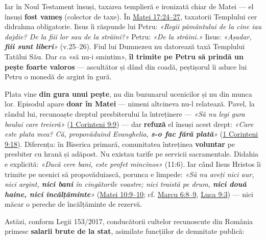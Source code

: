 \documentclass[12pt,a4paper,twoside,openany]{book}
\begin{document}
Iar în Noul Testament însuși, taxarea templieră e ironizată chiar de Matei — el însuși \textbf{fost vameș} (colector de taxe). În \href{https://bibliaortodoxa.ro/carte.php?id=55\&cap=17\#24}{Matei 17:24–27}, taxatorii Templului cer didrahma obligatorie. Iisus îi răspunde lui Petru: \textit{«Regii pământului de la cine iau dajdie? De la fiii lor sau de la străini?»} Petru: \textit{«De la străini.»} Iisus: \textit{«Așadar, \textbf{fiii sunt liberi}»} (v.25–26). Fiul lui Dumnezeu nu datorează taxă Templului Tatălui Său. Dar ca «să nu-i smintim», \textbf{îl trimite pe Petru să prindă un pește foarte valoros} — ascultător și dând din coadă, peștișorul îi aduce lui Petru o monedă de argint în gură.

Plata vine \textbf{din gura unui pește}, nu din buzunarul ucenicilor și nu din munca lor. Episodul apare \textbf{doar în Matei} — nimeni altcineva nu-l relatează. Pavel, la rândul lui, recunoaște dreptul presbiterului la întreținere — \textit{«Să nu legi gura boului care treieră»} (\href{https://bibliaortodoxa.ro/carte.php?id=12\&cap=9\#9}{1 Corinteni 9:9}) — dar \textbf{refuză} el însuși acest drept: \textit{«Care este plata mea? Că, propovăduind Evanghelia, \textbf{s-o fac fără plată}»} (\href{https://bibliaortodoxa.ro/carte.php?id=12\&cap=9\#18}{1 Corinteni 9:18}). Diferența: în Biserica primară, comunitatea întreținea \textbf{voluntar} pe presbiter cu hrană și adăpost. Nu existau tarife pe servicii sacramentale. Didahia e explicită: \textit{«Dacă cere bani, este profet mincinos»} (11:6). Iar când Iisus Hristos îi trimite pe ucenici să propovăduiască, porunca e limpede: \textit{«Să nu aveți nici aur, nici argint, \textbf{nici bani} în cingătorile voastre; nici traistă pe drum, \textbf{nici două haine, nici încălțăminte}»} (\href{https://bibliaortodoxa.ro/carte.php?id=55\&cap=10\#9}{Matei 10:9–10}; cf. \href{https://bibliaortodoxa.ro/carte.php?id=53\&cap=6\#8}{Marcu 6:8–9}, \href{https://bibliaortodoxa.ro/carte.php?id=48\&cap=9\#3}{Luca 9:3}) — nici măcar o pereche de încălțăminte de rezervă.

Astăzi, conform Legii 153/2017, conducătorii cultelor recunoscute din România primesc \textbf{salarii brute de la stat}, asimilate funcțiilor de demnitate publică:
\end{document}
